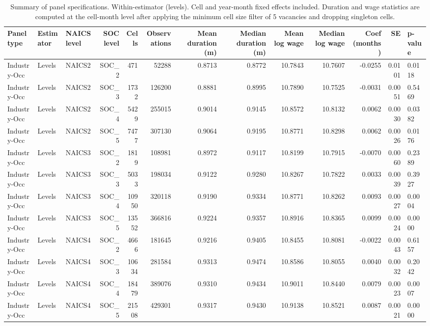 \begin{table}
\caption{Summary of panel specifications. Within-estimator (levels). Cell and year-month fixed effects included. Duration and wage statistics are computed at the cell-month level after applying the minimum cell size filter of 5 vacancies and dropping singleton cells.}
\label{tab:model_summary}
\begin{tabular}{lllrrrrrrrrr}
\toprule
Panel type & Estimator & NAICS level & SOC level & Cells & Observations & Mean duration (m) & Median duration (m) & Mean log wage & Median log wage & Coef (months) & SE & p-value \\
\midrule
Industry-Occ & Levels & NAICS2 & SOC_2 & 471 & 52288 & 0.8713 & 0.8772 & 10.7843 & 10.7607 & -0.0255 & 0.0101 & 0.0118 \\
Industry-Occ & Levels & NAICS2 & SOC_3 & 1732 & 126200 & 0.8881 & 0.8995 & 10.7890 & 10.7525 & -0.0031 & 0.0051 & 0.5469 \\
Industry-Occ & Levels & NAICS2 & SOC_4 & 5429 & 255015 & 0.9014 & 0.9145 & 10.8572 & 10.8132 & 0.0062 & 0.0030 & 0.0382 \\
Industry-Occ & Levels & NAICS2 & SOC_5 & 7477 & 307130 & 0.9064 & 0.9195 & 10.8771 & 10.8298 & 0.0062 & 0.0026 & 0.0176 \\
Industry-Occ & Levels & NAICS3 & SOC_2 & 1819 & 108981 & 0.8972 & 0.9117 & 10.8199 & 10.7915 & -0.0070 & 0.0060 & 0.2389 \\
Industry-Occ & Levels & NAICS3 & SOC_3 & 5033 & 198034 & 0.9122 & 0.9280 & 10.8267 & 10.7822 & 0.0033 & 0.0039 & 0.3927 \\
Industry-Occ & Levels & NAICS3 & SOC_4 & 10950 & 320118 & 0.9190 & 0.9334 & 10.8771 & 10.8262 & 0.0093 & 0.0027 & 0.0004 \\
Industry-Occ & Levels & NAICS3 & SOC_5 & 13552 & 366816 & 0.9224 & 0.9357 & 10.8916 & 10.8365 & 0.0099 & 0.0024 & 0.0000 \\
Industry-Occ & Levels & NAICS4 & SOC_2 & 4666 & 181645 & 0.9216 & 0.9405 & 10.8455 & 10.8081 & -0.0022 & 0.0043 & 0.6157 \\
Industry-Occ & Levels & NAICS4 & SOC_3 & 10634 & 281584 & 0.9313 & 0.9474 & 10.8586 & 10.8055 & 0.0040 & 0.0032 & 0.2042 \\
Industry-Occ & Levels & NAICS4 & SOC_4 & 18479 & 389076 & 0.9310 & 0.9434 & 10.9011 & 10.8440 & 0.0079 & 0.0023 & 0.0007 \\
Industry-Occ & Levels & NAICS4 & SOC_5 & 21508 & 429301 & 0.9317 & 0.9430 & 10.9138 & 10.8521 & 0.0087 & 0.0021 & 0.0000 \\

\end{tabular}
\end{table}
